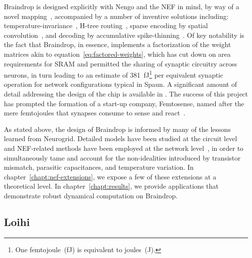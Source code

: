 Braindrop is designed explicitly with Nengo and the NEF in mind, by way of a novel mapping~\citep{voelker2017iscas, neckar2018optimizing}, accompanied by a number of inventive solutions including: temperature-invariance~\citep{abrams2017, reidpint2019, benjamintemp2019}, H-tree routing~\citep{fokserial2018}, sparse encoding by spatial convolution~\citep{feinstein1988hexagonal, braindrop2019}, and decoding by accumulative spike-thinning~\citep{fokthinning2019}.
Of key notability is the fact that Braindrop, in essence, implements a factorization of the weight matrices akin to equation~\ref{eq:factored-weights}, which has cut down on area requirements for SRAM and permitted the sharing of synaptic circuitry across neurons, in turn leading to an estimate of 381~fJ\footnote{
One femtojoule~(fJ) is equivalent to  joules~(J).}
per equivalent synaptic operation for network configurations typical in Spaun.
A significant amount of detail addressing the design of the chip is available in \citet{neckar2018braindrop, fok2018communicating, braindrop2019}.
The success of this project has prompted the formation of a start-up company, Femtosense, named after the mere femtojoules that synapses consume to sense and react~\citep{femtosense}. 

As stated above, the design of Braindrop is informed by many of the lessons learned from Neurogrid.
Detailed models have been studied at the circuit level~\citep{benjamintemp2019} and NEF-related methods have been employed at the network level~\citep{voelker2017iscas, reidpint2019}, in order to simultaneously tame and account for the non-idealities introduced by transistor mismatch, parasitic capacitances, and temperature variation.
In chapter~\ref{chapt:nef-extensions}, we expose a few of these extensions at a theoretical level.
In chapter~\ref{chapt:results}, we provide applications that demonstrate robust dynamical computation on Braindrop.



\subsection{Loihi}

